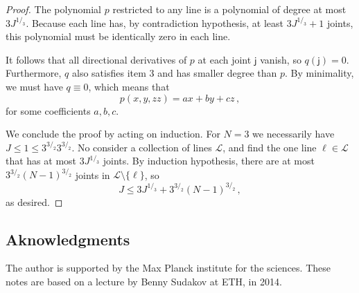 \documentclass[12pt]{amsart}
\theoremstyle{definition}
\newcommand{\vj}{\mathsf{j}}
\begin{document}
\begin{proof}
The polynomial $p$ restricted to any line is a polynomial of degree at most $3J^{1/_3}$.
Because each line has, by contradiction hypothesis, at least $3 J^{1/_3} + 1$ joints, this polynomial must be identically zero in each line.

It follows that all directional derivatives of $p$ at each joint $\vj$ vanish, so $q(\vj) = 0$.
Furthermore, $q$ also satisfies item 3 and has smaller degree than $p$.
By minimality, we must have $q \equiv 0$, which means that 
$$ p(x, y, zz ) = ax +by + cz \, ,$$
for some coefficients $a, b, c$.


We conclude the proof by acting on induction. For $N = 3$ we necessarily have $J\leq 1 \leq 3^{3/_2} 3^{3/_2}$.
No consider a collection of lines $\mathcal L$, and find the one line $\ell \in \mathcal L$ that has at most $3 J^{1/_3}$ joints.
By induction hypothesis, there are at most $3^{3/_2} (N-1)^{3/_2}$ joints in $\mathcal L \setminus \{\ell \}$, so 
$$ J \leq 3 J^{1/_3} + 3^{3/_2} (N-1)^{3/_2}\, , $$
as desired.
\end{proof}

\subsection*{Aknowledgments}
The author is supported by the Max Planck institute for the sciences. 
These notes are based on a lecture by Benny Sudakov at ETH, in 2014.



\end{document}
